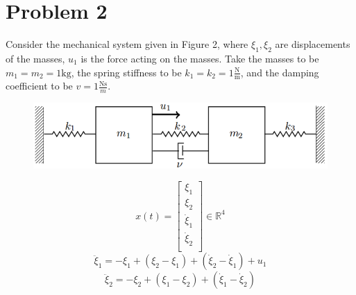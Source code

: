 \documentclass{article}
\begin{document}
\newpage

\section*{Problem 2}
Consider the mechanical system given in Figure 2, where $\xi_1, \xi_2$ are displacements of the masses, $u_1$ is the force acting on the masses.
Take the masses to be $m_1 = m_2 = 1\text{kg}$, the spring stiffness to be $k_1 = k_2 = 1 \frac{\text{N}}{\text{m}}$, and the damping coefficient to be $v = 1 \frac{\text{Ns}}{m}$.
\begin{figure}[h!]
\centering
\includegraphics[width=.8\linewidth]{images_static/damped_mass_spring_system.png}
\end{figure}

$$ x(t) =
\begin{bmatrix}
\xi_1 \\
\xi_2 \\
\dot{\xi}_1 \\
\dot{\xi}_2 \\
\end{bmatrix}
\in \mathbb{R}^4
$$
$$ \ddot{\xi}_1 = -\xi_1 + (\xi_2 - \xi_1) + (\dot{\xi}_2 - \dot{\xi}_1) + u_1 $$
$$ \ddot{\xi}_2 = -\xi_2 + (\xi_1 - \xi_2) + (\dot{\xi}_1 - \dot{\xi}_2) $$
\end{document}
